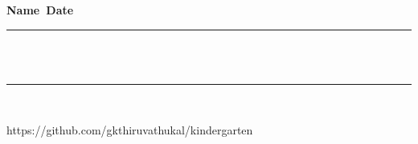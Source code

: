 \documentclass[10pt,letterpaper]{article}
\begin{document}
{\bf Name\ \underline{\hskip 200pt}\hskip 130pt}{\bf Date\
\underline{\hskip 150pt}}

\vskip 1cm

{
\vskip 10pt
\rule[1.75ex]{7.5in}{1pt}
\\
\hdashrule{7.75in}{1pt}{4mm}
\\
\rule[-1.75ex]{7.5in}{1pt}
\\
}

\vskip 1cm

https://github.com/gkthiruvathukal/kindergarten
\end{document}
